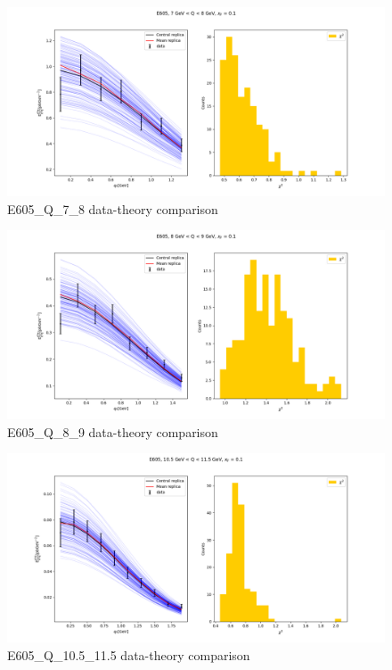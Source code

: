 \documentclass[
]{article}
\begin{document}
\begin{figure}
\centering
\includegraphics{pngplots/E605_Q_7_8.png}
\caption{E605\_Q\_7\_8 data-theory comparison}
\end{figure}

\begin{figure}
\centering
\includegraphics{pngplots/E605_Q_8_9.png}
\caption{E605\_Q\_8\_9 data-theory comparison}
\end{figure}

\begin{figure}
\centering
\includegraphics{pngplots/E605_Q_10.5_11.5.png}
\caption{E605\_Q\_10.5\_11.5 data-theory comparison}
\end{figure}
\end{document}

